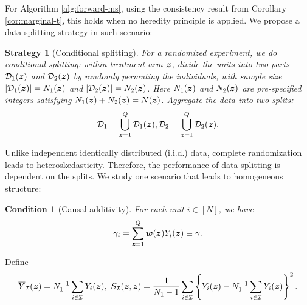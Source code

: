 \documentclass[12pt]{article}
\newtheorem{condition}{Condition}
\newtheorem{strategy}{Strategy}
\begin{document}
For Algorithm \ref{alg:forward-ms}, using the consistency result from Corollary \ref{cor:marginal-t}, this holds when no heredity principle is applied. We propose a data splitting strategy in such scenario:

\begin{strategy}[Conditional splitting]\label{str:data-splitting} For a randomized experiment, we do conditional splitting: within treatment arm ${\boldsymbol{z}}$, divide the units into two parts ${\mathcal{D}}_1({\boldsymbol{z}})$ and ${\mathcal{D}}_2({\boldsymbol{z}})$ by randomly permuting the individuals, with sample size $|{\mathcal{D}}_1({\boldsymbol{z}})|= N_1({\boldsymbol{z}})$ and $|{\mathcal{D}}_2({\boldsymbol{z}})| = N_2({\boldsymbol{z}})$. Here $N_1({\boldsymbol{z}})$ and $N_2({\boldsymbol{z}}) $ are pre-specified integers satisfying $N_1({\boldsymbol{z}}) + N_2({\boldsymbol{z}}) = N({\boldsymbol{z}})$. Aggregate the data into two splits:
\begin{align*}
    {\mathcal{D}}_1 = \bigcup_{{\boldsymbol{z}}=1}^Q {\mathcal{D}}_1({\boldsymbol{z}}), {\mathcal{D}}_2 = \bigcup_{{\boldsymbol{z}}=1}^Q {\mathcal{D}}_2({\boldsymbol{z}}).
\end{align*}
\end{strategy}

Unlike independent identically distributed (i.i.d.) data, complete randomization leads to heteroskedasticity. Therefore, the performance of data splitting is dependent on the splits. We study one scenario that leads to homogeneous structure:
\begin{condition}[Causal additivity]\label{cond:causal-additivity}
For each unit $i\in[N]$, we have
\begin{align*}
    \gamma_i = \sum_{{\boldsymbol{z}}=1}^Q {\boldsymbol{w}}({\boldsymbol{z}})Y_i({\boldsymbol{z}}) \equiv \gamma.
\end{align*}
\end{condition}


Define
\begin{gather*}
    \overline{Y}_{{\mathcal{I}}}({\boldsymbol{z}}) = N_1^{-1}\sum_{i\in{\mathcal{I}}}Y_i({\boldsymbol{z}}),~ S_{{\mathcal{I}}}({\boldsymbol{z}},{\boldsymbol{z}}) =\frac{1}{N_1 - 1}\sum_{i\in{\mathcal{I}}} \left\{Y_i({\boldsymbol{z}}) - N_1^{-1}\sum_{i\in{\mathcal{I}}}Y_i({\boldsymbol{z}})\right\}^2.
\end{gather*}
\end{document}
